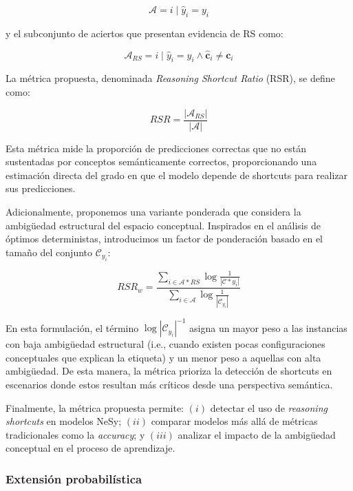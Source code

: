 \documentclass[12pt]{article}
\begin{document}
\begin{equation}
\mathcal{A} = {i \mid \hat{y}_i = y_i}
\end{equation}

y el subconjunto de aciertos que presentan evidencia de RS como:

\begin{equation}
\mathcal{A}_{RS} = {i \mid \hat{y}_i = y_i \wedge \hat{\mathbf{c}}_i \neq \mathbf{c}_i}
\end{equation}

La métrica propuesta, denominada \textit{Reasoning Shortcut Ratio} (RSR), se define como:

\begin{equation}
RSR = \frac{|\mathcal{A}_{RS}|}{|\mathcal{A}|}
\end{equation}

Esta métrica mide la proporción de predicciones correctas que no están sustentadas por conceptos semánticamente correctos, proporcionando una estimación directa del grado en que el modelo depende de shortcuts para realizar sus predicciones.

Adicionalmente, proponemos una variante ponderada que considera la ambigüedad estructural del espacio conceptual. Inspirados en el análisis de óptimos deterministas, introducimos un factor de ponderación basado en el tamaño del conjunto $\mathcal{C}_{y_i}$:

\begin{equation}
RSR_w = \frac{\sum_{i \in \mathcal{A}*{RS}} \log \frac{1}{|\mathcal{C}*{y_i}|}}{\sum_{i \in \mathcal{A}} \log \frac{1}{|\mathcal{C}_{y_i}|}}
\end{equation}

En esta formulación, el término $\log |\mathcal{C}_{y_i}|^{-1}$ asigna un mayor peso a las instancias con baja ambigüedad estructural (i.e., cuando existen pocas configuraciones conceptuales que explican la etiqueta) y un menor peso a aquellas con alta ambigüedad. De esta manera, la métrica prioriza la detección de shortcuts en escenarios donde estos resultan más críticos desde una perspectiva semántica.

Finalmente, la métrica propuesta permite: $(i)$ detectar el uso de \textit{reasoning shortcuts} en modelos NeSy; $(ii)$ comparar modelos más allá de métricas tradicionales como la \textit{accuracy}; y $(iii)$ analizar el impacto de la ambigüedad conceptual en el proceso de aprendizaje.

\subsubsection{Extensión probabilística}
\end{document}
